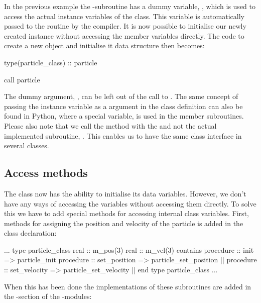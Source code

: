 In the previous example the -subroutine has a dummy variable, , which is used to access the actual instance variables of the class. This variable is automatically passed to the routine by the compiler. It is now possible to initialise our newly created instance without accessing the member variables directly. The code to create a new object and initialise it data structure then becomes:

\begin{fortrancodeenv}
type(particle_class) :: particle

call particle %
\end{fortrancodeenv}

The dummy argument, , can be left out of the call to . The same concept of passing the instance variable as a argument in the class definition can also be found in Python, where a special variable,  is used in the member subroutines. Please also note that we call the method with the  and not the actual implemented subroutine, . This enables us to have the same class interface in several classes.

\subsection{Access methods}

The class now has the ability to initialise its data variables. However, we don't have any ways of accessing the variables without accessing them directly. To solve this we have to add special methods for accessing internal class variables. First, methods for assigning the position and velocity of the particle is added in the class declaration:

\begin{fortrancodeenv}
    ...
    type particle_class
        real :: m_pos(3)
        real :: m_vel(3)
    contains
        procedure :: init => particle_init
        procedure :: set_position => particle_set_position |\hladded|
        procedure :: set_velocity => particle_set_velocity |\hladded|
    end type particle_class
    ...
\end{fortrancodeenv}

When this has been done the implementations of these subroutines are added in the -section of the -modules:
    
